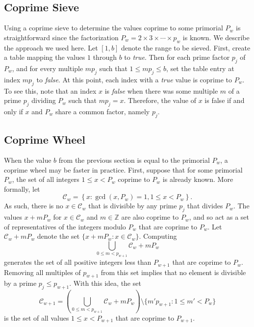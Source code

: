 \documentclass{ucalgthes1}
\theoremstyle{definition}
\newcommand{\ZZ}{\mathbb{Z}}
\newcommand{\set}{\mathcal}
\begin{document}
\subsection{Coprime Sieve}

Using a coprime sieve to determine the values coprime to some primorial $P_w$ is straightforward since the factorization $P_w = 2 \times 3 \times \cdots \times p_w$ is known.  We describe the approach we used here.  Let $[1,b]$ denote the range to be sieved.  First, create a table mapping the values $1$ through $b$ to \emph{true}.  Then for each prime factor $p_j$ of $P_w$, and for every multiple $mp_j$ such that $1 \le mp_j \le b$, set the table entry at index $mp_j$ to \emph{false}.  At this point, each index with a \emph{true} value is coprime to $P_w$.  To see this, note that an index $x$ is \emph{false} when there was some multiple $m$ of a prime $p_j$ dividing $P_w$ such that $mp_j = x$.  Therefore, the value of $x$ is false if and only if $x$ and $P_w$ share a common factor, namely $p_j$.

\subsection{Coprime Wheel}
\label{subsec:coprimeWheel}
\newcommand{\coprimeset}{\set C}
\newcommand{\coprimelist}{\set D}

When the value $b$ from the previous section is equal to the primorial $P_w$, a coprime wheel may be faster in practice.  First, suppose that for some primorial $P_w$, the set of all integers $1 \le x < P_w$ coprime to $P_w$ is already known.  More formally, let
\[
	\coprimeset_w = \left\{x : \gcd(x, P_w) = 1, 1 \le x < P_w \right\}.
\]
As such, there is no $x \in \coprimeset_w$ that is divisible by any prime $p_j$ that divides $P_w$.  The values $x + mP_w$ for $x \in \coprimeset_w$ and $m \in \ZZ$ are also coprime to $P_w$, and so act as a set of representatives of the integers modulo $P_w$ that are coprime to $P_w$.  Let $\coprimeset_w + mP_w$ denote the set $\{x + mP_w : x \in \coprimeset_w\}$.  Computing
\[
	\bigcup_{0 \le m < p_{w+1}} \coprimeset_w + mP_w
\]
generates the set of all positive integers less than $P_{w+1}$ that are coprime to $P_w$.  Removing all multiples of $p_{w+1}$ from this set implies that no element is divisible by a prime $p_j \le p_{w+1}$.  With this idea, the set
\[
	\coprimeset_{w+1} =
		\left( \bigcup_{0 \le m < p_{w+1}} \coprimeset_w + mP_w \right)
	    \setminus \{ m' p_{w+1} : 1 \le m' < P_w \}
\]
is the set of all values $1 \le x < P_{w+1}$ that are coprime to $P_{w+1}$.
\end{document}
